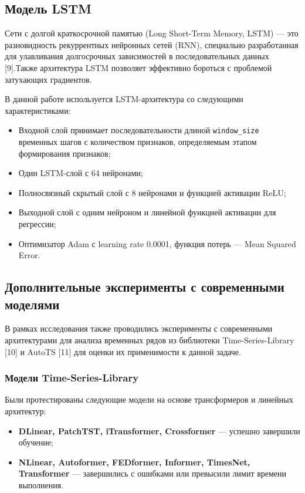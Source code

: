 \subsection{Модель LSTM}
\hspace*{1.25cm}Сети с долгой краткосрочной памятью (Long Short-Term Memory, LSTM) — это разновидность рекуррентных нейронных сетей (RNN), специально разработанная для улавливания долгосрочных зависимостей в последовательных данных [9].Также архитектура LSTM позволяет эффективно бороться с проблемой затухающих градиентов.

\hspace*{1.25cm}В данной работе используется LSTM-архитектура со следующими характеристиками:
\begin{itemize}
	\item Входной слой принимает последовательности длиной \texttt{window\_size} временных шагов с количеством признаков, определяемым этапом формирования признаков;
	\item Один LSTM-слой с 64 нейронами;
	\item Полносвязный скрытый слой с 8 нейронами и функцией активации ReLU;
	\item Выходной слой с одним нейроном и линейной функцией активации для регрессии;
	\item Оптимизатор Adam с learning rate 0.0001, функция потерь --- Mean Squared Error.
\end{itemize}

\subsection{Дополнительные эксперименты с современными моделями}

\hspace*{1.25cm}В рамках исследования также проводились эксперименты с современными архитектурами для анализа временных рядов из библиотеки Time-Series-Library [10] и AutoTS [11] для оценки их применимости к данной задаче.

\subsubsection{Модели Time-Series-Library}

\hspace*{1.25cm}Были протестированы следующие модели на основе трансформеров и линейных архитектур:
\begin{itemize}
	\item \textbf{DLinear, PatchTST, iTransformer, Crossformer} --- успешно завершили обучение;
	\item \textbf{NLinear, Autoformer, FEDformer, Informer, TimesNet, Transformer} --- завершились с ошибками или превысили лимит времени выполнения.
\end{itemize}

